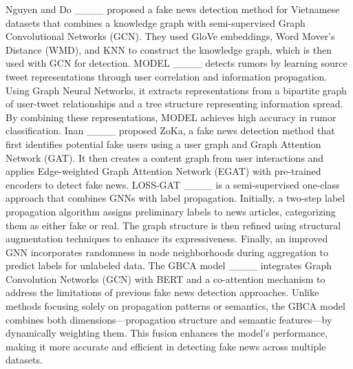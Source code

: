 Nguyen and Do ____ proposed a fake news detection method for Vietnamese datasets that combines a knowledge graph with semi-supervised Graph Convolutional Networks (GCN). They used GloVe embeddings, Word Mover’s Distance (WMD), and KNN to construct the knowledge graph, which is then used with GCN for detection.
MODEL ____ detects rumors by learning source tweet representations through user correlation and information propagation. Using Graph Neural Networks, it extracts representations from a bipartite graph of user-tweet relationships and a tree structure representing information spread. By combining these representations, MODEL achieves high accuracy in rumor classification.
Inan ____ proposed ZoKa, a fake news detection method that first identifies potential fake users using a user graph and Graph Attention Network (GAT). It then creates a content graph from user interactions and applies Edge-weighted Graph Attention Network (EGAT) with pre-trained encoders to detect fake news.
LOSS-GAT ____ is a semi-supervised one-class approach that combines GNNs with label propagation. Initially, a two-step label propagation algorithm assigns preliminary labels to news articles, categorizing them as either fake or real. The graph structure is then refined using structural augmentation techniques to enhance its expressiveness. Finally, an improved GNN incorporates randomness in node neighborhoods during aggregation to predict labels for unlabeled data.
The GBCA model ____ integrates Graph Convolution Networks (GCN) with BERT and a co-attention mechanism to address the limitations of previous fake news detection approaches. Unlike methods focusing solely on propagation patterns or semantics, the GBCA model combines both dimensions—propagation structure and semantic features—by dynamically weighting them. This fusion enhances the model's performance, making it more accurate and efficient in detecting fake news across multiple datasets.

